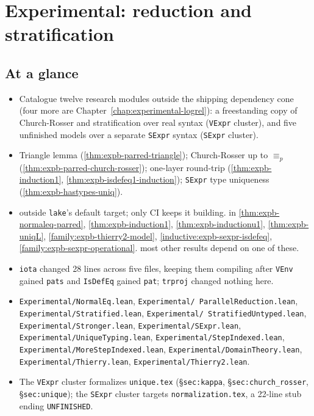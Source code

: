 \chapter{Experimental: reduction and stratification}
\label{chap:experimental-reduction}

\section*{At a glance}
\begin{itemize}
\item {} Catalogue twelve research modules outside the shipping dependency cone (four more
are Chapter~\ref{chap:experimental-logrel}): a freestanding copy of Church-Rosser and stratification
over real syntax (\texttt{VExpr} cluster), and five unfinished models over a separate \texttt{SExpr}
syntax (\texttt{SExpr} cluster).
\item {} Triangle lemma (\ref{thm:expb-parred-triangle}); Church-Rosser up to
$\equiv_p$ (\ref{thm:expb-parred-church-rosser}); one-layer round-trip
(\ref{thm:expb-induction1}, \ref{thm:expb-isdefeq1-induction}); \texttt{SExpr} type uniqueness
(\ref{thm:expb-hastypes-uniq}).
\item {} \stExperimental{} outside \texttt{lake}'s default target; only CI keeps it
building. \stSorry{} in \ref{thm:expb-normaleq-parred}, \ref{thm:expb-induction1},
\ref{thm:expb-inductionu1}, \ref{thm:expb-uniqL}, \ref{family:expb-thierry2-model},
\ref{inductive:expb-sexpr-isdefeq}, \ref{family:expb-sexpr-operational}. \stTainted{} most other
results depend on one of these.
\item {} \texttt{iota} changed 28 lines across five files, keeping them compiling
after \texttt{VEnv} gained \texttt{pats} and \texttt{IsDefEq} gained \texttt{pat}; \texttt{trproj}
changed nothing here.
\item {} \texttt{Experimental/NormalEq.lean}, \texttt{Experimental/%
ParallelReduction.lean}, \texttt{Experimental/Stratified.lean}, \texttt{Experimental/%
StratifiedUntyped.lean}, \texttt{Experimental/Stronger.lean}, \texttt{Experimental/SExpr.lean},
\texttt{Experimental/UniqueTyping.lean}, \texttt{Experimental/StepIndexed.lean},
\texttt{Experimental/MoreStepIndexed.lean}, \texttt{Experimental/DomainTheory.lean},
\texttt{Experimental/Thierry.lean}, \texttt{Experimental/Thierry2.lean}.
\item {} The \texttt{VExpr} cluster formalizes \texttt{unique.tex}
(\S\texttt{sec:kappa}, \S\texttt{sec:church\_rosser}, \S\texttt{sec:unique}); the \texttt{SExpr}
cluster targets \texttt{normalization.tex}, a 22-line stub ending \texttt{UNFINISHED}.
\end{itemize}

